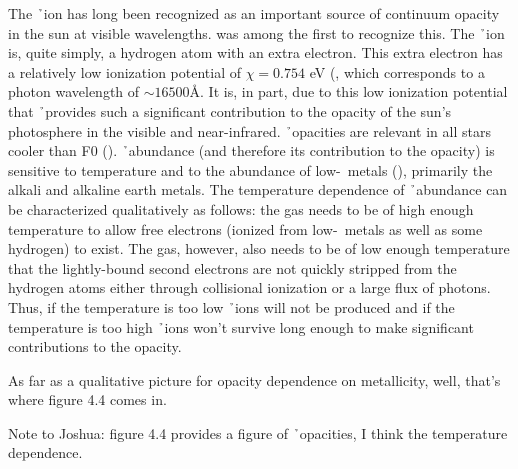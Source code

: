 
The \h\ ion has long been recognized as an important source of
continuum opacity in the sun at visible
wavelengths. \citet{Wildt1939a,Wildt1939b} was among the first to
recognize this.  The \h\ ion is, quite simply, a hydrogen atom with an extra electron.  This extra electron
has a relatively low ionization potential of $\chi = 0.754$ eV
(\citealt{carroll2007introduction}, which corresponds to a photon
wavelength of $\sim 16500$\AA.  It is, in part, due to this low
ionization potential that \h\ provides such  a significant contribution to the opacity of the sun's
photosphere in the visible and near-infrared.  \h\ opacities are relevant in all
stars cooler than F0 (\citealt{carroll2007introduction}). \h\
abundance (and therefore its contribution to the opacity) is sensitive 
to temperature and to the abundance of low-\chii\ metals
(\citealt{hansen1994stellar}), primarily the alkali and alkaline earth metals.  The temperature dependence of \h\
abundance can be characterized qualitatively as follows: the gas needs
to be of high enough temperature to allow free electrons (ionized from
low-\chii\ metals as well as some hydrogen) to exist.  The gas,
however, also needs to be of low enough temperature that the
lightly-bound second electrons are not quickly stripped from the
hydrogen atoms either through collisional ionization or a large flux
of photons.  Thus, if the temperature is too low \h\ ions will not be
produced and if the temperature is too high \h\ ions won't survive
long enough to make significant contributions to the opacity.

As far as a qualitative picture for opacity dependence on metallicity,
well, that's where figure 4.4 comes in.

Note to Joshua:  \cite{hansen1994stellar} figure 4.4 provides a figure
of \h\ opacities, I think the temperature dependence.
